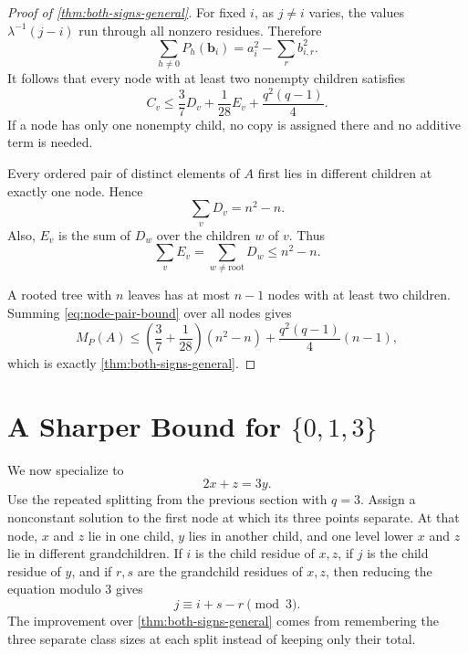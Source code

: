 \documentclass[11pt]{article}
\numberwithin{equation}{section}
\theoremstyle{remark}
\begin{document}
\begin{proof}[Proof of \cref{thm:both-signs-general}]
For fixed $i$, as $j\ne i$ varies, the values
$\lambda^{-1}(j-i)$ run through all nonzero residues.  Therefore
\[
 \sum_{h\ne0}P_h(\mathbf b_i)
 =a_i^2-\sum_r b_{i,r}^2.
\]
It follows that every node with at least two nonempty children satisfies
\begin{equation}\label{eq:node-pair-bound}
 C_v
 \le \frac37D_v+\frac1{28}E_v+\frac{q^2(q-1)}4.
\end{equation}
If a node has only one nonempty child, no copy is assigned there and no
additive term is needed.

Every ordered pair of distinct elements of $A$ first lies in different
children at exactly one node.  Hence
\begin{equation}\label{eq:sum-general-D}
 \sum_vD_v=n^2-n.
\end{equation}
Also, $E_v$ is the sum of $D_w$ over the children $w$ of $v$.  Thus
\begin{equation}\label{eq:sum-general-E}
 \sum_vE_v=\sum_{w\ne\mathrm{root}}D_w\le n^2-n.
\end{equation}

A rooted tree with $n$ leaves has at most $n-1$ nodes with at least two
children.  Summing \eqref{eq:node-pair-bound} over all nodes gives
\[
 M_P(A)
 \le\left(\frac37+\frac1{28}\right)(n^2-n)
 +\frac{q^2(q-1)}4(n-1),
\]
which is exactly \cref{thm:both-signs-general}.
\end{proof}

\section{A Sharper Bound for \texorpdfstring{$\{0,1,3\}$}{0,1,3}}
\label{sec:013-stronger}
We now specialize to
\begin{equation}\label{eq:main-equation}
 2x+z=3y.
\end{equation}
Use the repeated splitting from the previous section with $q=3$.  Assign a
nonconstant solution to the first node at which its three points separate.
At that node, $x$ and $z$ lie in one child, $y$ lies in another child, and
one level lower $x$ and $z$ lie in different grandchildren.  If $i$ is the
child residue of $x,z$, if $j$ is the child residue of $y$, and if $r,s$
are the grandchild residues of $x,z$, then reducing the equation modulo $3$
gives
\begin{equation}\label{eq:mod3-digit-rule}
 j\equiv i+s-r\pmod3.
\end{equation}
The improvement over \cref{thm:both-signs-general} comes from remembering
the three separate class sizes at each split instead of keeping only their
total.
\end{document}
